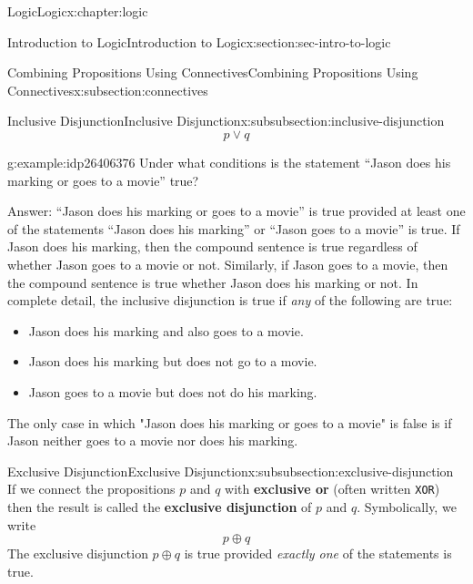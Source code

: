 \documentclass[twoside,10pt,]{book}
\newcommand{\mono}[1]{\texttt{#1}}
\newcommand{\terminology}[1]{\textbf{#1}}
\numberwithin{equation}{section}
\begin{document}
\begin{chapterptx}{Logic}{}{Logic}{}{}{x:chapter:logic}
\begin{sectionptx}{Introduction to Logic}{}{Introduction to Logic}{}{}{x:section:sec-intro-to-logic}
\begin{subsectionptx}{Combining Propositions Using Connectives}{}{Combining Propositions Using Connectives}{}{}{x:subsection:connectives}
\begin{subsubsectionptx}{Inclusive Disjunction}{}{Inclusive Disjunction}{}{}{x:subsubsection:inclusive-disjunction}
\begin{equation*}
p {\vee} q
\end{equation*}
%
\begin{example}{}{g:example:idp26406376}%
Under what conditions is the statement ``Jason does his marking or goes to a movie'' true?%
\par
Answer: ``Jason does his marking or goes to a movie'' is true provided at least one of the statements ``Jason does his marking'' or ``Jason goes to a movie'' is true.  If Jason does his marking, then the compound sentence is true regardless of whether Jason goes to a movie or not.  Similarly, if Jason goes to a movie, then the compound sentence is true whether Jason does his marking or not.  In complete detail, the inclusive disjunction is true if \emph{any} of the following are true:%
\begin{itemize}[label=\textbullet]
\item{}Jason does his marking and also goes to a movie.%
\item{}Jason does his marking but does not go to a movie.%
\item{}Jason goes to a movie but does not do his marking.%
\end{itemize}
The only case in which "Jason does his marking or goes to a movie" is false is if Jason neither goes to a movie nor does his marking.%
\end{example}
\end{subsubsectionptx}
%
%
\typeout{************************************************}
\typeout{************************************************}
%
\begin{subsubsectionptx}{Exclusive Disjunction}{}{Exclusive Disjunction}{}{}{x:subsubsection:exclusive-disjunction}
If we connect the propositions \(p\) and \(q\) with \terminology{exclusive or} (often written \mono{XOR}) then the result is called the \terminology{exclusive disjunction} of \(p\) and \(q\).  Symbolically, we write%
\begin{equation*}
p{\oplus} q
\end{equation*}
The exclusive disjunction \(p{\oplus} q\) is true provided \emph{exactly one} of the statements is true.%
\end{subsubsectionptx}
%
%
\typeout{************************************************}
\typeout{************************************************}

\end{subsectionptx}
\end{sectionptx}
\end{chapterptx}
\end{document}
